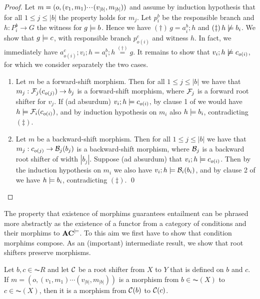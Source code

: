 \begin{proof}
Let $m = (o,(v_1,m_1){\cdotp\mkern-2mu\cdotp\mkern-2mu\cdotp\mkern1mu} (v_{|b|},m_{|b|}))$ and assume by induction hypothesis that for all $1\leq j\leq |b|$ the property holds for $m_j$. Let $p^b_i$ be the responsible branch and $h: P^b_i \to G$ the witness for $g\models b$. 
Hence we have $(\dagger)\, g=a^b_i;h$ and $(\ddagger)\, h \not\models b_i$.  
We show that $g \models c$, with responsible branch $p^c_{o(i)}$ and witness $h$. In fact, we immediately have  $a^c_{o(i)}; v_i ;h = a^b_i ; h \stackrel{(\dagger)}{=} g$. It remains to show that $v_i ;h \not\models c_{o(i)}$, for which we consider separately the two cases.
\begin{enumerate}
\item Let $m$ be a forward-shift morphism. Then for all $1\leq j\leq |b|$ we have that   $m_j:\mathcal{F}_j(c_{o(j)}) \to b_j$ is a forward-shift morphism, where $\mathcal{F}_j$ is a forward root shifter for $v_j$. If (ad absurdum) $v_i ;h \models c_{o(i)}$, by clause 1 of  we would have $h \models \mathcal{F}_i(c_{o(i)})$, and by induction hypothesis on $m_i$ also $h \models b_i$, contradicting $(\ddagger)$.

\item Let $m$ be a backward-shift morphism. Then for all $1\leq j\leq |b|$ we have that  $m_j:c_{o(j)}\to \mathcal{B}_j(b_j)$ is a backward-shift morphism, where $\mathcal{B}_j$ is a backward root shifter of width $|b_j|$.
Suppose (ad absurdum) that $v_i ;h \models c_{o(i)}$. Then by the induction hypothesis on $m_i$ we also have $v_i ;h \models \mathcal{B}_i(b_i)$, and by clause 2 of  we  have $h \models b_i$, contradicting $(\ddagger)$.
\qed
\end{enumerate}
\end{proof}
%
The property that existence of morphims guarantees entailment can be phrased more abstractly as the existence of a functor from a category of conditions and their morphims to $\mathbf{AC}^{\models}$. To this aim we first have to show that condition morphims compose. As an (important) intermediate result, we show that root shifters preserve morphisms.

\begin{lemma}
Let $b,c \in  \AC{R}$ and let $\mathcal{C}$ be a root shifter from $X$ to $Y$ that is defined on $b$ and $c$. If $m = (o,(v_1,m_1)\cdots(v_{|b|},m_{|b|}))$ is a morphism from $b\in \AC(X)$ to $c\in\AC(X)$, then it is a morphism from $\mathcal{C}(b)$ to $\mathcal{C}(c)$. 
\end{lemma}

